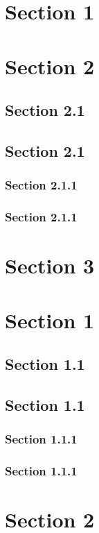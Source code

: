 \section*{Section 1}
\hypertarget{_section_1}{}
\section*{Section 2}
\hypertarget{_section_2}{\subsection*{Section 2.1}}
\subsection*{Section 2.1}
\hypertarget{_section_2.1}{\subsubsection*{Section 2.1.1}}
\subsubsection*{Section 2.1.1}
\hypertarget{_section_2.1.1}{}
\section*{Section 3}
\hypertarget{_section_3}{}

\section*{Section 1}
\hypertarget{_section_1}{\subsection*{Section 1.1}}
\subsection*{Section 1.1}
\hypertarget{_section_1.1}{\subsubsection*{Section 1.1.1}}
\subsubsection*{Section 1.1.1}
\hypertarget{_section_1.1.1}{}
\section*{Section 2}
\hypertarget{_section_2}{}

